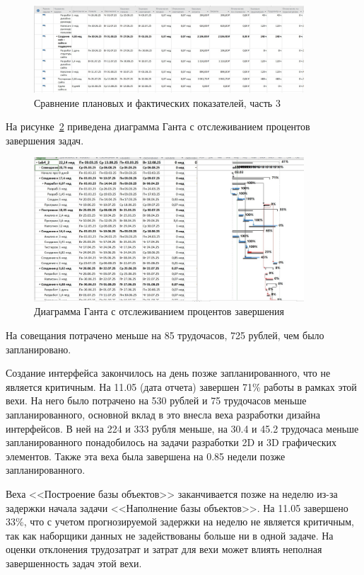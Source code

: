 \begin{figure}[H]
	\centering
	\includegraphics[width=0.9\textwidth]{img/lab4/screen28.jpg}
	\caption{Сравнение плановых и фактических показателей, часть 3}
	\label{fig:screen28}
\end{figure}

На рисунке~\ref{fig:screen35} приведена диаграмма Ганта с отслеживанием процентов завершения задач.

\begin{figure}[H]
	\centering
	\includegraphics[width=0.9\textwidth]{img/lab4/screen35.jpg}
	\caption{Диаграмма Ганта с отслеживанием процентов завершения}
	\label{fig:screen35}
\end{figure}

На совещания потрачено меньше на 85 трудочасов, 725 рублей, чем было запланировано.

Создание интерфейса закончилось на день позже запланированного, что не является критичным.
На 11.05 (дата отчета) завершен 71\% работы в рамках этой вехи.
На него было потрачено на 530 рублей и 75 трудочасов меньше запланированного, основной вклад в это внесла веха разработки дизайна интерфейсов.
В ней на 224 и 333 рубля меньше, на 30.4 и 45.2 трудочаса меньше запланированного понадобилось на задачи разработки 2D и 3D графических элементов.
Также эта веха была завершена на 0.85 недели позже запланированного.

Веха <<Построение базы объектов>> заканчивается позже на неделю из-за задержки начала задачи <<Наполнение базы объектов>>.
На 11.05 завершено 33\%, что с учетом прогнозируемой задержки на неделю не является критичным, так как наборщики данных не задействованы больше ни в одной задаче.
На оценки отклонения трудозатрат и затрат для вехи может влиять неполная завершенность задач этой вехи.

